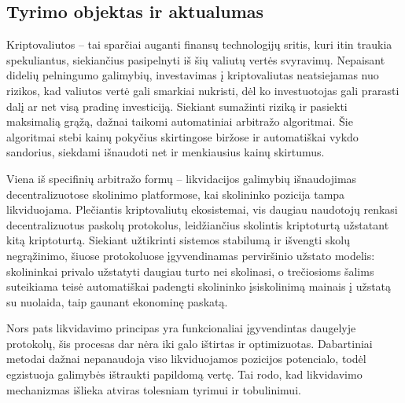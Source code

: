 \documentclass[]{VUMIFTemplateClass}
\begin{document}

\subsection*{Tyrimo objektas ir aktualumas}
Kriptovaliutos – tai sparčiai auganti finansų technologijų sritis, kuri itin traukia spekuliantus, siekiančius pasipelnyti iš šių valiutų vertės svyravimų. Nepaisant didelių pelningumo galimybių, investavimas į kriptovaliutas neatsiejamas nuo rizikos, kad valiutos vertė gali smarkiai nukristi, dėl ko investuotojas gali prarasti dalį ar net visą pradinę investiciją. Siekiant sumažinti riziką ir pasiekti maksimalią grąžą, dažnai taikomi automatiniai arbitražo algoritmai. Šie algoritmai stebi kainų pokyčius skirtingose biržose ir automatiškai vykdo sandorius, siekdami išnaudoti net ir menkiausius kainų skirtumus.

Viena iš specifinių arbitražo formų – likvidacijos galimybių išnaudojimas decentralizuotose skolinimo platformose, kai skolininko pozicija tampa likviduojama. Plečiantis kriptovaliutų ekosistemai, vis daugiau naudotojų renkasi decentralizuotus paskolų protokolus, leidžiančius skolintis kriptoturtą užstatant kitą kriptoturtą. Siekiant užtikrinti sistemos stabilumą ir išvengti skolų negrąžinimo, šiuose protokoluose įgyvendinamas perviršinio užstato modelis: skolininkai privalo užstatyti daugiau turto nei skolinasi, o trečiosioms šalims suteikiama teisė automatiškai padengti skolininko įsiskolinimą mainais į užstatą su nuolaida, taip gaunant ekonominę paskatą.

Nors pats likvidavimo principas yra funkcionaliai įgyvendintas daugelyje protokolų, šis procesas dar nėra iki galo ištirtas ir optimizuotas. Dabartiniai metodai dažnai nepanaudoja viso likviduojamos pozicijos potencialo, todėl egzistuoja galimybės ištraukti papildomą vertę. Tai rodo, kad likvidavimo mechanizmas išlieka atviras tolesniam tyrimui ir tobulinimui.
\end{document}
